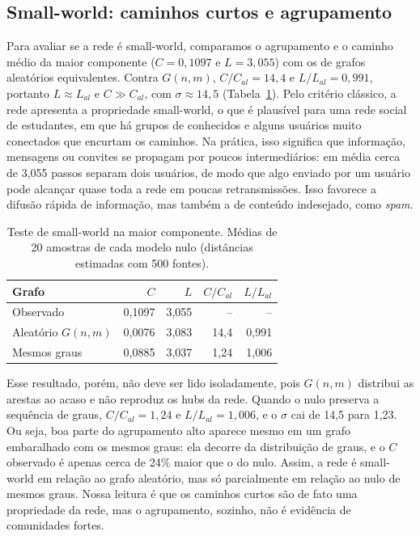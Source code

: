 \documentclass[sigconf]{webmedia}
\newcommand{\caminhoMedio}{3{,}055}
\newcommand{\sigmaER}{14{,}5}
\newcommand{\sigmaGrau}{1{,}23}
\newcommand{\razaoCER}{14{,}4}
\newcommand{\razaoLER}{0{,}991}
\newcommand{\razaoCGrau}{1{,}24}
\newcommand{\razaoLGrau}{1{,}006}
\begin{document}
\subsection{Small-world: caminhos curtos e agrupamento}
Para avaliar se a rede é small-world, comparamos o agrupamento e o caminho médio da maior componente ($C=0{,}1097$ e $L=\caminhoMedio$) com os de grafos aleatórios equivalentes. Contra $G(n,m)$, $C/C_{al}=\razaoCER$ e $L/L_{al}=\razaoLER$, portanto $L\approx L_{al}$ e $C\gg C_{al}$, com $\sigma\approx\sigmaER$ (Tabela~\ref{tab:smallworld}). Pelo critério clássico, a rede apresenta a propriedade small-world, o que é plausível para uma rede social de estudantes, em que há grupos de conhecidos e alguns usuários muito conectados que encurtam os caminhos. Na prática, isso significa que informação, mensagens ou convites se propagam por poucos intermediários: em média cerca de \caminhoMedio{} passos separam dois usuários, de modo que algo enviado por um usuário pode alcançar quase toda a rede em poucas retransmissões. Isso favorece a difusão rápida de informação, mas também a de conteúdo indesejado, como \emph{spam}.

\begin{table}
  \caption{Teste de small-world na maior componente. Médias de 20 amostras de cada modelo nulo (distâncias estimadas com 500 fontes).}
  \label{tab:smallworld}
  \small
  \begin{tabular}{lrrrr}
    \toprule
    Grafo & $C$ & $L$ & $C/C_{al}$ & $L/L_{al}$ \\
    \midrule
    Observado & 0,1097 & 3,055 & -- & -- \\
    Aleatório $G(n,m)$ & 0,0076 & 3,083 & 14,4 & 0,991 \\
    Mesmos graus & 0,0885 & 3,037 & 1,24 & 1,006 \\
    \bottomrule
  \end{tabular}
\end{table}

Esse resultado, porém, não deve ser lido isoladamente, pois $G(n,m)$ distribui as arestas ao acaso e não reproduz os hubs da rede. Quando o nulo preserva a sequência de graus, $C/C_{al}=\razaoCGrau$ e $L/L_{al}=\razaoLGrau$, e o $\sigma$ cai de \sigmaER{} para \sigmaGrau{}. Ou seja, boa parte do agrupamento alto aparece mesmo em um grafo embaralhado com os mesmos graus: ela decorre da distribuição de graus, e o $C$ observado é apenas cerca de 24\% maior que o do nulo. Assim, a rede é small-world em relação ao grafo aleatório, mas só parcialmente em relação ao nulo de mesmos graus. Nossa leitura é que os caminhos curtos são de fato uma propriedade da rede, mas o agrupamento, sozinho, não é evidência de comunidades fortes.
\end{document}
